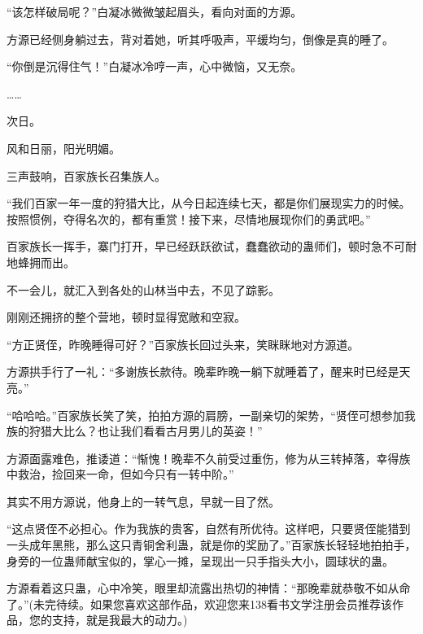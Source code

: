 \begin{this_body}
“该怎样破局呢？”白凝冰微微皱起眉头，看向对面的方源。

方源已经侧身躺过去，背对着她，听其呼吸声，平缓均匀，倒像是真的睡了。

“你倒是沉得住气！”白凝冰冷哼一声，心中微恼，又无奈。

……

次日。

风和日丽，阳光明媚。

三声鼓响，百家族长召集族人。

“我们百家一年一度的狩猎大比，从今日起连续七天，都是你们展现实力的时候。按照惯例，夺得名次的，都有重赏！接下来，尽情地展现你们的勇武吧。”

百家族长一挥手，寨门打开，早已经跃跃欲试，蠢蠢欲动的蛊师们，顿时急不可耐地蜂拥而出。

不一会儿，就汇入到各处的山林当中去，不见了踪影。

刚刚还拥挤的整个营地，顿时显得宽敞和空寂。

“方正贤侄，昨晚睡得可好？”百家族长回过头来，笑眯眯地对方源道。

方源拱手行了一礼：“多谢族长款待。晚辈昨晚一躺下就睡着了，醒来时已经是天亮。”

“哈哈哈。”百家族长笑了笑，拍拍方源的肩膀，一副亲切的架势，“贤侄可想参加我族的狩猎大比么？也让我们看看古月男儿的英姿！”

方源面露难色，推诿道：“惭愧！晚辈不久前受过重伤，修为从三转掉落，幸得族中救治，捡回来一命，但如今只有一转中阶。”

其实不用方源说，他身上的一转气息，早就一目了然。

“这点贤侄不必担心。作为我族的贵客，自然有所优待。这样吧，只要贤侄能猎到一头成年黑熊，那么这只青铜舍利蛊，就是你的奖励了。”百家族长轻轻地拍拍手，身旁的一位蛊师献宝似的，掌心一摊，呈现出一只手指头大小，圆球状的蛊。

方源看着这只蛊，心中冷笑，眼里却流露出热切的神情：“那晚辈就恭敬不如从命了。”(未完待续。如果您喜欢这部作品，欢迎您来138看书文学注册会员推荐该作品，您的支持，就是我最大的动力。)

\end{this_body}

